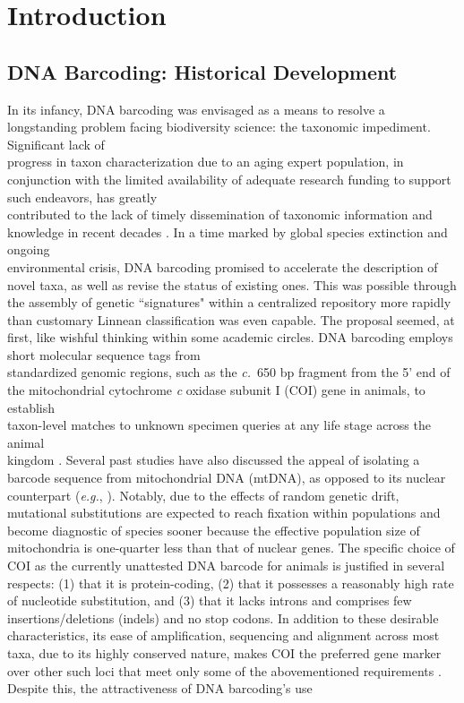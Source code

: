 \section{Introduction}

\subsection{DNA Barcoding: Historical Development}

In its infancy, DNA barcoding \cite{hebert2003biological}  was envisaged as a means to resolve a longstanding problem facing biodiversity science: the taxonomic impediment. 
Significant lack of \\ progress in taxon characterization due to an aging expert population, in conjunction with the limited availability of adequate research funding to support such endeavors, has greatly \\ contributed to the lack of timely dissemination of taxonomic information and knowledge in recent decades \cite{cao2016rapid}. In a time marked by global species extinction and ongoing \\ environmental crisis, DNA barcoding promised to accelerate the description of novel taxa, as well as revise the status of existing ones. This was possible through the assembly of genetic ``signatures" within a centralized repository more rapidly than customary Linnean classification was even capable. The proposal seemed, at first, like wishful thinking within some academic circles. DNA barcoding employs short molecular sequence tags from \\ standardized genomic regions, such as the \textit{c.}~650 bp fragment from the 5' end of the mitochondrial cytochrome \textit{c} oxidase subunit I (COI) gene in animals, to establish \\ taxon-level matches to unknown specimen queries at any life stage across the animal \\ kingdom \cite{hebert2003barcoding}. Several past studies have also discussed the appeal of isolating a barcode sequence from mitochondrial DNA (mtDNA), as opposed to its nuclear counterpart (\textit{e.g.}, \cite{hubert2015dna, hubert2008identifying}). Notably, due to the effects of random genetic drift, mutational substitutions are expected to reach fixation within populations and become diagnostic of species sooner because the effective population size of mitochondria is one-quarter less than that of nuclear genes. The specific choice of COI as the currently unattested DNA barcode for animals is justified in several respects: (1) that it is protein-coding, (2) that it possesses a reasonably high rate of  nucleotide substitution, and (3) that it lacks introns and comprises few \\ insertions/deletions (indels) and no stop codons. In addition to these desirable \\ characteristics, its ease of amplification, sequencing and alignment across most taxa, due to its highly conserved nature, makes COI the preferred gene marker over other such loci that meet only some of the abovementioned requirements \cite{phillips2019incomplete}. Despite this, the attractiveness of DNA barcoding's use 